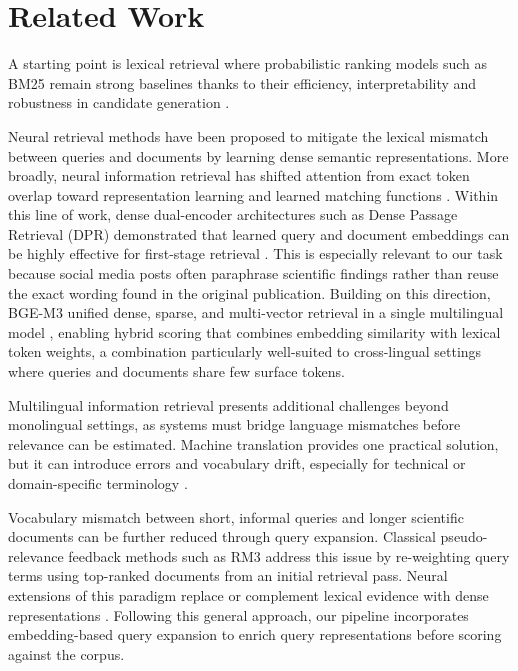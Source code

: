 \section{Related Work}
\label{sec:related}

A starting point is lexical retrieval where probabilistic ranking models such as BM25 remain strong baselines thanks to their efficiency, interpretability and robustness in candidate generation \citep{RobertsonZaragoza2009}.

Neural retrieval methods have been proposed to mitigate the lexical mismatch between queries and documents by learning dense semantic representations. More broadly, neural information retrieval has shifted attention from exact token overlap toward representation learning and learned matching functions \citep{MarchesinEtAl2020}. Within this line of work, dense dual-encoder architectures such as Dense Passage Retrieval (DPR) demonstrated that learned query and document embeddings can be highly effective for first-stage retrieval \citep{KarpukhinEtAl2020}. This is especially relevant to our task because social media posts often paraphrase scientific findings rather than reuse the exact wording found in the original publication. Building on this direction, BGE-M3 unified dense, sparse, and multi-vector retrieval in a single multilingual model \citep{bge-m3},
enabling hybrid scoring that combines embedding similarity with lexical token weights, a combination particularly well-suited to cross-lingual settings where queries and documents share few surface tokens.

Multilingual information retrieval presents additional challenges beyond monolingual settings, as systems must bridge language mismatches before relevance can be estimated. Machine translation provides one practical solution, but it can introduce errors and vocabulary drift, especially for technical or domain-specific terminology \citep{SennrichEtAl2016}.

Vocabulary mismatch between short, informal queries and longer scientific documents can be further reduced through query expansion. Classical pseudo-relevance feedback methods such as RM3 \citep{LavrenkoEtAl2001} address this issue by re-weighting query terms using top-ranked documents from an initial retrieval pass. Neural extensions of this paradigm replace or complement lexical evidence with dense representations \citep{WangEtAl2021PRF}. Following this general approach, our pipeline incorporates embedding-based query expansion to enrich query representations before scoring against the corpus.

